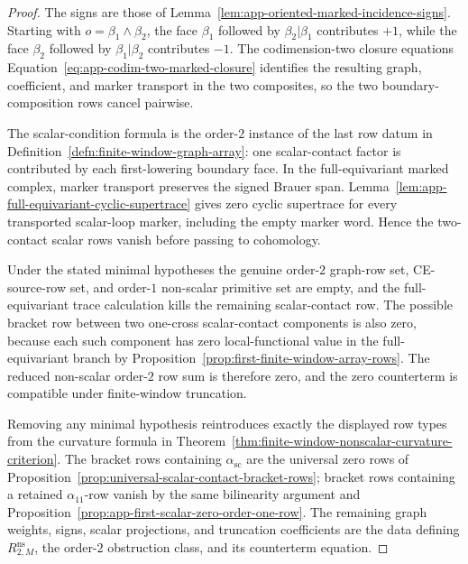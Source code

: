 \begin{proof}
  The signs are those of
  Lemma~\ref{lem:app-oriented-marked-incidence-signs}.  Starting with
  \(o=\beta_1\wedge\beta_2\), the face \(\beta_1\) followed by
  \(\beta_2|\beta_1\) contributes \(+1\), while the face \(\beta_2\)
  followed by \(\beta_1|\beta_2\) contributes \(-1\).  The
  codimension-two closure equations
  Equation~\eqref{eq:app-codim-two-marked-closure} identifies the resulting graph,
  coefficient, and marker transport in the two composites, so the two
  boundary-composition rows cancel pairwise.

  The scalar-condition formula is the order-\(2\) instance of the last row datum
  in Definition~\ref{defn:finite-window-graph-array}: one scalar-contact
  factor is contributed by each first-lowering boundary face.  In the
  full-equivariant marked complex, marker transport preserves the signed
  Brauer span.  Lemma~\ref{lem:app-full-equivariant-cyclic-supertrace}
  gives zero cyclic supertrace for every transported scalar-loop marker,
  including the empty marker word.  Hence the two-contact scalar rows
  vanish before passing to cohomology.

  Under the stated minimal hypotheses the genuine order-\(2\) graph-row
  set, CE-source-row set, and order-\(1\) non-scalar primitive set are
  empty, and the full-equivariant trace calculation kills the remaining
  scalar-contact row.  The possible bracket row
  between two one-cross scalar-contact components is also zero, because
  each such component has zero local-functional value in the
  full-equivariant branch by
  Proposition~\ref{prop:first-finite-window-array-rows}.  The reduced
  non-scalar order-\(2\) row sum is therefore zero, and the zero
  counterterm is compatible under finite-window truncation.

  Removing any minimal hypothesis reintroduces exactly the displayed row
  types from the curvature formula in
  Theorem~\ref{thm:finite-window-nonscalar-curvature-criterion}.  The
  bracket rows containing \(\alpha_{\mathrm{sc}}\) are the universal zero
  rows of
  Proposition~\ref{prop:universal-scalar-contact-bracket-rows}; bracket rows
  containing a retained \(\alpha_{11}\)-row vanish by the same bilinearity
  argument and
  Proposition~\ref{prop:app-first-scalar-zero-order-one-row}.  The
  remaining graph weights, signs, scalar projections, and truncation
  coefficients are the data defining \(R^{\mathrm{ns}}_{2,M}\), the
  order-\(2\) obstruction class, and its counterterm equation.
\end{proof}

